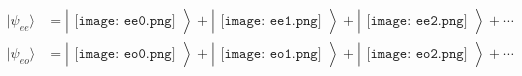 \documentclass[10pt]{article}
\begin{document}
\begin{align}
\vert \psi_{ee} \rangle &= 
\left\vert
\begin{array}{c}
\texttt{[image: ee0.png]}
\end{array}
\right\rangle
+
\left\vert
\begin{array}{c}
\texttt{[image: ee1.png]}
\end{array}
\right\rangle
+
\left\vert
\begin{array}{c}
\texttt{[image: ee2.png]}
\end{array}
\right\rangle
+
\cdots\\
\vert \psi_{eo} \rangle &= 
\left\vert
\begin{array}{c}
\texttt{[image: eo0.png]}
\end{array}
\right\rangle
+
\left\vert
\begin{array}{c}
\texttt{[image: eo1.png]}
\end{array}
\right\rangle
+
\left\vert
\begin{array}{c}
\texttt{[image: eo2.png]}
\end{array}
\right\rangle
+
\cdots
\end{align}
\end{document}
